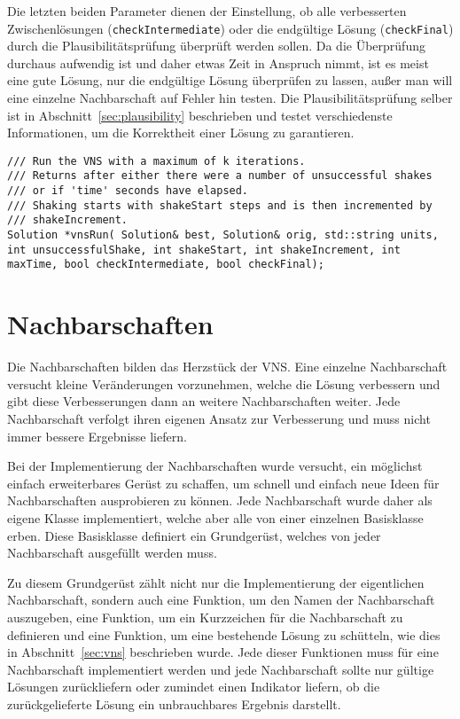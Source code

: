 Die letzten beiden Parameter dienen der Einstellung, ob alle verbesserten Zwischenlösungen (\texttt{checkIntermediate}) oder die endgültige Lösung (\texttt{checkFinal}) durch die Plausibilitätsprüfung überprüft werden sollen.
Da die Überprüfung durchaus aufwendig ist und daher etwas Zeit in Anspruch nimmt, ist es meist eine gute Lösung, nur die endgültige Lösung überprüfen zu lassen, außer man will eine einzelne Nachbarschaft
auf Fehler hin testen. Die Plausibilitätsprüfung selber ist in Abschnitt~\ref{sec:plausibility} beschrieben und testet verschiedenste Informationen, um die Korrektheit einer Lösung zu garantieren.
\singlespacing
\begin{lstlisting}[caption={Signatur der Funktion, welche die Variable Nachbarschaftssuche ausführt und steuert},label={lst:vns}]
/// Run the VNS with a maximum of k iterations.
/// Returns after either there were a number of unsuccessful shakes 
/// or if 'time' seconds have elapsed.
/// Shaking starts with shakeStart steps and is then incremented by
/// shakeIncrement.
Solution *vnsRun( Solution& best, Solution& orig, std::string units, int unsuccessfulShake, int shakeStart, int shakeIncrement, int maxTime, bool checkIntermediate, bool checkFinal);
\end{lstlisting}

\section{Nachbarschaften}
Die Nachbarschaften bilden das Herzstück der VNS\@. Eine einzelne Nachbarschaft versucht kleine Veränderungen vorzunehmen, welche die Lösung verbessern und gibt diese Verbesserungen dann an weitere Nachbarschaften weiter.
Jede Nachbarschaft verfolgt ihren eigenen Ansatz zur Verbesserung und muss nicht immer bessere Ergebnisse liefern. 

Bei der Implementierung der Nachbarschaften wurde versucht, ein möglichst einfach erweiterbares Gerüst zu schaffen, um schnell und einfach neue Ideen für Nachbarschaften ausprobieren zu können. Jede Nachbarschaft
wurde daher als eigene Klasse implementiert, welche aber alle von einer einzelnen Basisklasse erben. Diese Basisklasse definiert ein Grundgerüst, welches von jeder Nachbarschaft ausgefüllt werden muss. 

Zu diesem Grundgerüst zählt nicht nur die Implementierung der eigentlichen Nachbarschaft, sondern auch eine Funktion, um den Namen der Nachbarschaft auszugeben, eine Funktion, um ein Kurzzeichen für die Nachbarschaft
zu definieren und eine Funktion, um eine bestehende Lösung zu schütteln, wie dies in Abschnitt~\ref{sec:vns} beschrieben wurde. Jede dieser Funktionen muss für eine Nachbarschaft implementiert werden und jede Nachbarschaft
sollte nur gültige Lösungen zurückliefern oder zumindet einen Indikator liefern, ob die zurückgelieferte Lösung ein unbrauchbares Ergebnis darstellt.

